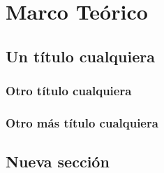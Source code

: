 
\chapter{Marco Teórico}
\label{ch:marcoteorico}

\lipsum[1]

\section{Un título cualquiera}

\lipsum[1]

\subsection{Otro título cualquiera}

\lipsum[2-4]

\subsection{Otro más título cualquiera}

\lipsum[5-6]

\section{Nueva sección}

\lipsum[1-3]

